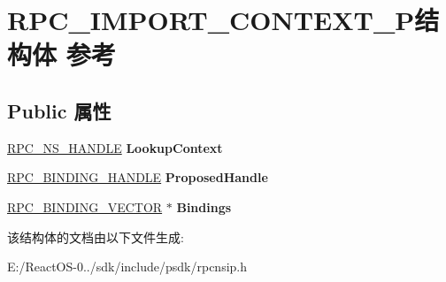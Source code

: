 \hypertarget{struct_r_p_c___i_m_p_o_r_t___c_o_n_t_e_x_t___p}{}\section{R\+P\+C\+\_\+\+I\+M\+P\+O\+R\+T\+\_\+\+C\+O\+N\+T\+E\+X\+T\+\_\+\+P结构体 参考}
\label{struct_r_p_c___i_m_p_o_r_t___c_o_n_t_e_x_t___p}
\subsection*{Public 属性}
\begin{DoxyCompactItemize}
\item 
\mbox{\label{struct_r_p_c___i_m_p_o_r_t___c_o_n_t_e_x_t___p_a5ee461e09a2e0dfaccf2fac4e44fa651}} 
\hyperlink{interfacevoid}{R\+P\+C\+\_\+\+N\+S\+\_\+\+H\+A\+N\+D\+LE} {\bfseries Lookup\+Context}
\item 
\mbox{\label{struct_r_p_c___i_m_p_o_r_t___c_o_n_t_e_x_t___p_a4008c6b85966fd163b80c70ab75627d1}} 
\hyperlink{interfacevoid}{R\+P\+C\+\_\+\+B\+I\+N\+D\+I\+N\+G\+\_\+\+H\+A\+N\+D\+LE} {\bfseries Proposed\+Handle}
\item 
\mbox{\label{struct_r_p_c___i_m_p_o_r_t___c_o_n_t_e_x_t___p_a18f1f6472aa72f537444e371e7a9a0d0}} 
\hyperlink{struct___r_p_c___b_i_n_d_i_n_g___v_e_c_t_o_r}{R\+P\+C\+\_\+\+B\+I\+N\+D\+I\+N\+G\+\_\+\+V\+E\+C\+T\+OR} $\ast$ {\bfseries Bindings}
\end{DoxyCompactItemize}


该结构体的文档由以下文件生成\+:\begin{DoxyCompactItemize}
\item 
E\+:/\+React\+O\+S-\/0../sdk/include/psdk/rpcnsip.\+h\end{DoxyCompactItemize}
